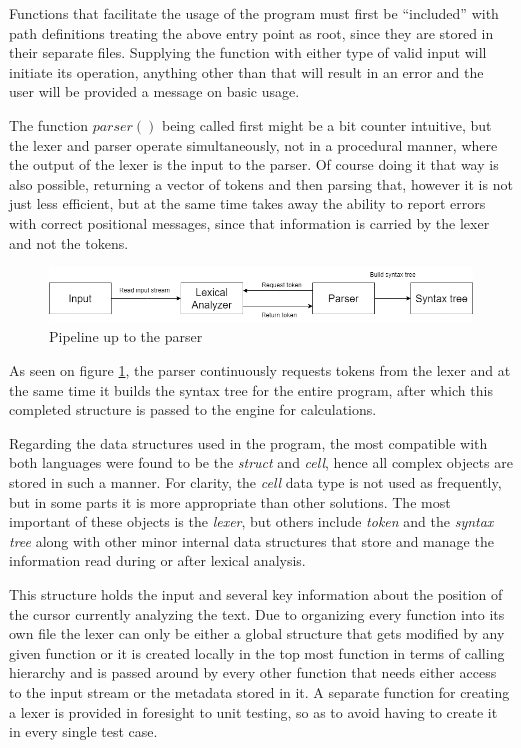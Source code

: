 Functions that facilitate the usage of the program must first be ``included'' with path definitions treating the above entry point as root, since they are stored in their separate files. Supplying the function with either type of valid input will initiate its operation, anything other than that will result in an error and the user will be provided a message on basic usage.

The function $parser()$ being called first might be a bit counter intuitive, but the lexer and parser operate simultaneously, not in a procedural manner, where the output of the lexer is the input to the parser. Of course doing it that way is also possible, returning a vector of tokens and then parsing that, however it is not just less efficient, but at the same time takes away the ability to report errors with correct positional messages, since that information is carried by the lexer and not the tokens.

\begin{figure}[!h]
	\centering
	\includegraphics[width=1\textwidth]{images/parserOperation}
	\caption{Pipeline up to the parser}
	\label{fig:parserOp}
\end{figure}

As seen on figure \ref{fig:parserOp}, the parser continuously requests tokens from the lexer and at the same time it builds the syntax tree for the entire program, after which this completed structure is passed to the engine for calculations.

Regarding the data structures used in the program, the most compatible with both languages were found to be the \textit{struct} and \textit{cell}, hence all complex objects are stored in such a manner. For clarity,  the \textit{cell} data type is not used as frequently, but in some parts it is more appropriate than other solutions. The most important of these objects is the \textit{lexer}, but others include \textit{token} and the \textit{syntax tree} along with other minor internal data structures that store and manage the information read during or after lexical analysis.

This structure holds the input and several key information about the position of the cursor currently analyzing the text. Due to organizing every function into its own file the lexer can only be either a global structure that gets modified by any given function or it is created locally in the top most function in terms of calling hierarchy and is passed around by every other function that needs either access to the input stream or the metadata stored in it. A separate function for creating a lexer is provided in foresight to unit testing, so as to avoid having to create it in every single test case.

